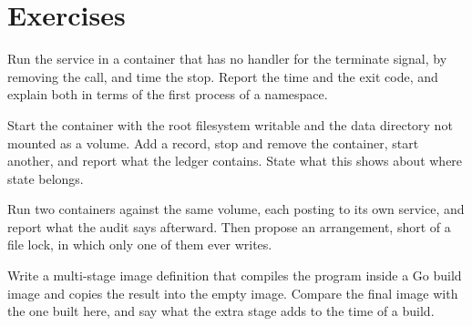 \section*{Exercises}

\begin{exercise}
Run the service in a container that has no handler for the terminate signal, by removing the  call, and time the stop. Report the time and the exit code, and explain both in terms of the first process of a namespace.
\end{exercise}

\begin{exercise}
Start the container with the root filesystem writable and the data directory not mounted as a volume. Add a record, stop and remove the container, start another, and report what the ledger contains. State what this shows about where state belongs.
\end{exercise}

\begin{exercise}
Run two containers against the same volume, each posting to its own service, and report what the audit says afterward. Then propose an arrangement, short of a file lock, in which only one of them ever writes.
\end{exercise}

\begin{exercise}
Write a multi-stage image definition that compiles the program inside a Go build image and copies the result into the empty image. Compare the final image with the one built here, and say what the extra stage adds to the time of a build.
\end{exercise}
